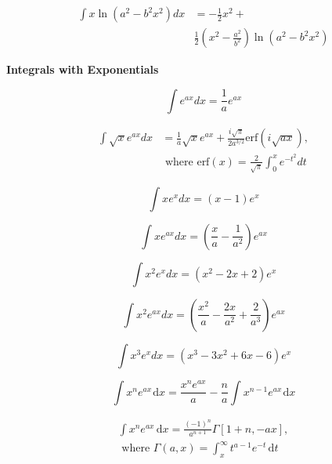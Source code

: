 \documentclass[11pt,twoside]{article}
\begin{document}
\begin{multicols}{3}
\begin{footnotesize}
\begin{align}
\int x \ln \left ( a^2 - b^2 x^2 \right ) dx &= -\frac{1}{2}x^2+ \nonumber
\\&
\frac{1}{2}\left( x^2 - \frac{a^2}{b^2} \right ) \ln \left (a^2 -b^2 x^2 \right)
\end{align}


\begin{center} \textbf{Integrals with Exponentials} \end{center}

\begin{equation}
\int e^{ax} dx = \frac{1}{a}e^{ax}
\end{equation}

\begin{align}
\int \sqrt{x} e^{ax} dx &= \frac{1}{a}\sqrt{x}e^{ax}
+\frac{i\sqrt{\pi}}{2a^{3/2}}
\text{erf}\left(i\sqrt{ax}\right), \nonumber \\&
\text{ where erf}(x)=\frac{2}{\sqrt{\pi}}\int_0^x e^{-t^2}dt
\end{align}

\begin{equation}
\int x e^x dx = (x-1) e^x
\end{equation}

\begin{equation}
\int x e^{ax} dx = \left(\frac{x}{a}-\frac{1}{a^2}\right) e^{ax}
\end{equation}

\begin{equation}
\int x^2 e^{x} dx = \left(x^2 - 2x + 2\right) e^{x}
\end{equation}

\begin{equation}
\int x^2 e^{ax} dx = \left(\frac{x^2}{a}-\frac{2x}{a^2}+\frac{2}{a^3}\right) e^{ax}
\end{equation}

\begin{equation}
\int x^3 e^{x} dx = \left(x^3-3x^2 + 6x - 6\right) e^{x}
\end{equation}

\begin{equation}
\int x^n e^{ax}\hspace{1pt}\text{d}x = \dfrac{x^n e^{ax}}{a} -
\dfrac{n}{a}\int x^{n-1}e^{ax}\hspace{1pt}\text{d}x
\end{equation}

\begin{equation}
\begin{split}
\int x^n e^{ax}\hspace{2pt}\text{d}x = \frac{(-1)^n}{a^{n+1}}\Gamma[1+n,-ax], \\
 \text{ where } \Gamma(a,x)=\int_x^{\infty} t^{a-1}e^{-t}\hspace{2pt}\text{d}t
 \end{split}
 \end{equation}


\end{footnotesize}
\end{multicols}
\end{document}
